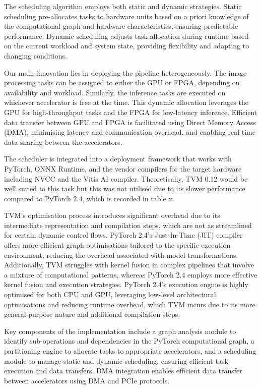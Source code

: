 \documentclass[]{spie}  %
\begin{document}
The scheduling algorithm employs both static and dynamic strategies. Static scheduling pre-allocates tasks to hardware units based on a priori knowledge of the computational graph and hardware characteristics, ensuring predictable performance. Dynamic scheduling adjusts task allocation during runtime based on the current workload and system state, providing flexibility and adapting to changing conditions.

Our main innovation lies in deploying the pipeline heterogeneously. The image processing tasks can be assigned to either the GPU or FPGA, depending on availability and workload. Similarly, the inference tasks are executed on whichever accelerator is free at the time. This dynamic allocation leverages the GPU for high-throughput tasks and the FPGA for low-latency inference. Efficient data transfer between GPU and FPGA is facilitated using Direct Memory Access (DMA), minimising latency and communication overhead, and enabling real-time data sharing between the accelerators.

The scheduler is integrated into a deployment framework that works with PyTorch, ONNX Runtime, and the vendor compilers for the target hardware including NVCC and the Vitis AI compiler. Theoretically, TVM 0.12 would be well suited to this task but this was not utilised due to its slower performance compared to PyTorch 2.4, which is recorded in table x.

TVM’s optimisation process introduces significant overhead due to its intermediate representation and compilation steps, which are not as streamlined for certain dynamic control flows. PyTorch 2.4's Just-In-Time (JIT) compiler offers more efficient graph optimisations tailored to the specific execution environment, reducing the overhead associated with model transformations. Additionally, TVM struggles with kernel fusion in complex pipelines that involve a mixture of computational patterns, whereas PyTorch 2.4 employs more effective kernel fusion and execution strategies. PyTorch 2.4’s execution engine is highly optimised for both CPU and GPU, leveraging low-level architectural optimisations and reducing runtime overhead, which TVM incurs due to its more general-purpose nature and additional compilation steps.

Key components of the implementation include a graph analysis module to identify sub-operations and dependencies in the PyTorch computational graph, a partitioning engine to allocate tasks to appropriate accelerators, and a scheduling module to manage static and dynamic scheduling, ensuring efficient task execution and data transfers. DMA integration enables efficient data transfer between accelerators using DMA and PCIe protocols.
\end{document}
